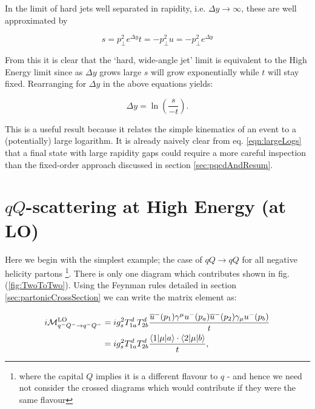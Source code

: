 		In the limit of hard jets well separated in rapidity, i.e. $\Delta y\rightarrow\infty$,
		these are well approximated by

		\begin{subequations}
			\begin{equation}
				s = p_\perp^2 e^{\Delta y}
			\end{equation}
			\begin{equation}
				t = -p_\perp^2
			\end{equation}
			\begin{equation}
				u = -p_\perp^2 e^{\Delta y}
			\end{equation}
			\label{eqn:mandel2}
		\end{subequations}

		From this it is clear that the `hard, wide-angle jet' limit is equivalent to the High Energy
		limit since as $\Delta y$ grows large $s$ will grow exponentially while $t$ will stay fixed.
		Rearranging for $\Delta y$ in the above equations yields:

		\begin{equation}
			\Delta y = \ln \left(\frac{s}{-t}\right).
			\label{eqn:largeLogs}
		\end{equation}

		This is a useful result because it relates the simple kinematics of an event to a (potentially)
		large logarithm.  It is already naively clear from eq. \eqref{eqn:largeLogs} that a final state
		with large rapidity gaps could require a more careful inspection than the fixed-order approach
		discussed in section \ref{sec:pqcdAndResum}.

	\section{$qQ$-scattering at High Energy (at LO)}
		\label{sec:qQScat}

		Here we begin with the simplest example; the case of $qQ\rightarrow qQ$ for all negative helicity partons
		\footnote{where the capital $Q$ implies it is a different flavour to $q$ - and hence we need not consider the crossed
		diagrams which would contribute if they were the same flavour}. There is only one diagram which contributes shown
		in fig. (\ref{fig:TwoToTwo}).  Using the Feynman rules detailed in section \ref{sec:partonicCrossSection} we can
		write the matrix element as:

		\begin{align}
			i\mathcal{M}_{q^-Q^-\rightarrow q^-Q^-}^{\text{LO}} &= ig_s^2T^d_{1a}T^d_{2b}\frac{\overline{u}^-(p_1)\gamma^\mu
			  u^-(p_a)\overline{u}^-(p_2)\gamma_\mu u^-(p_b)}{t}\\
			  &= ig_s^2T^d_{1a}T^d_{2b}\frac{\langle 1 | \mu | a \rangle\cdot\langle 2 | \mu | b \rangle}{t},
			  \label{eqn:similarBrackets}
		\end{align}


